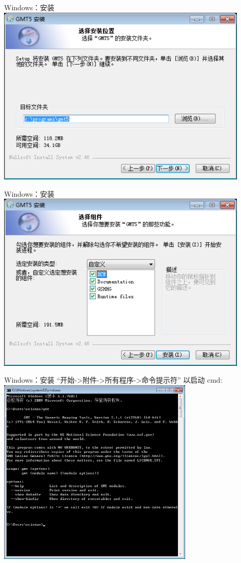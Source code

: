 \documentclass[UTF8, 11pt]{ctexbeamer}
\begin{document}
\begin{frame}{Windows：安装}
\centering
\includegraphics[width=0.9\textwidth]{GMT_win_install_2}
\end{frame}
\begin{frame}{Windows：安装}
\centering
\includegraphics[width=0.9\textwidth]{GMT_win_install_3}
\end{frame}
\begin{frame}{Windows：安装}
``开始->附件->所有程序->命令提示符'' 以启动 cmd:\\
\centering
\includegraphics[width=0.7\textwidth]{GMT_win_install_4}
\end{frame}
\end{document}
